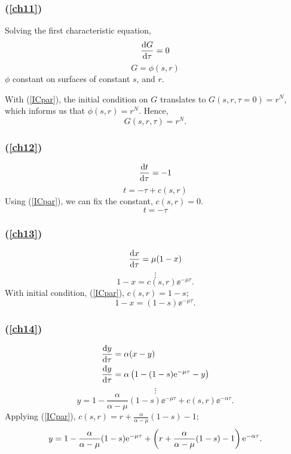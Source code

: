 \subsubsection*{(\ref{ch11})}
Solving the first characteristic equation,
$$\displaystyle\frac{{\rm d} G}{{\rm d} \tau} = 0$$
$$G = \phi(s,r)$$
$\phi$ constant on surfaces of constant $s$, and $r$.\par
With  (\ref{ICpar}), the initial condition on $G$ translates to $G(s,r,\tau=0) = r^N$, which informs us that $\phi(s,r) = r^N$. Hence,
\begin{equation}
\label{GrN}
G(s,r,\tau) = r^N.
\end{equation}



\subsubsection*{(\ref{ch12})}
$$\displaystyle\frac{{\rm d} t}{{\rm d} \tau} = -1$$
$$t = -\tau + c(s,r)$$
Using (\ref{ICpar}), we can fix the constant, $c(s,r) = 0$.
\begin{equation}
\label{minustau}
t = -\tau
\end{equation}


\subsubsection*{(\ref{ch13})}
$$\displaystyle\frac{{\rm d} x}{{\rm d} \tau} = \mu(1-x)$$
$$\vdots$$
$$1-x = c(s,r) \ee^{-\mu \tau}.$$
With initial condition, (\ref{ICpar}), $c(s,r) = 1-s$;
\begin{equation}
\label{sandxwithtau}
1-x = (1-s) \ee^{-\mu \tau}.
\end{equation}


\subsubsection*{(\ref{ch14})}

\begin{align*}
\displaystyle\frac{{\rm d} y}{{\rm d} \tau} &= \alpha(x-y)\\
\displaystyle\frac{{\rm d} y}{{\rm d} \tau} &= \alpha\left(1-(1-s) {\rm e}^{-\mu \tau} -y\right)
\end{align*}
$$\vdots$$
$$y = 1 - \frac{\alpha}{\alpha-\mu}(1-s)\ee^{-\mu\tau} + c(s,r)\ee^{-\alpha\tau}.$$
Applying (\ref{ICpar}), $c(s,r) = r + \frac{\alpha}{\alpha-\mu}(1-s) -1$;
\begin{equation}
\label{ywithr1}
y = 1 - \frac{\alpha}{\alpha-\mu}(1-s){\rm e}^{-\mu\tau} + \left( r + \frac{\alpha}{\alpha-\mu}(1-s) -1\right){\rm e}^{-\alpha\tau}.
\end{equation}

